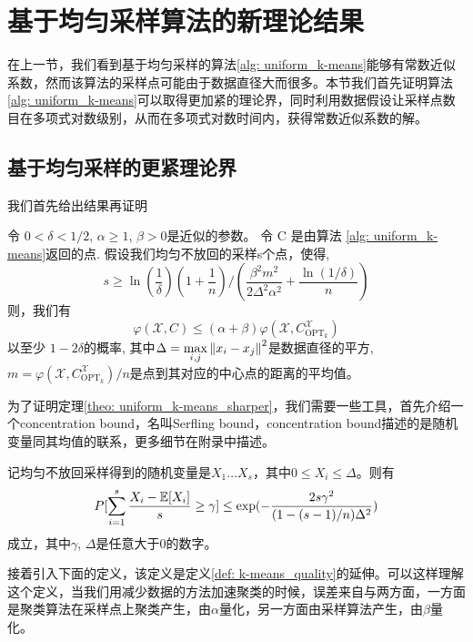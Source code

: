 \section{基于均匀采样算法的新理论结果}
在上一节，我们看到基于均匀采样的算法\ref{alg: uniform_k-means}能够有常数近似系数，然而该算法的采样点可能由于数据直径大而很多。本节我们首先证明算法\ref{alg: uniform_k-means}可以取得更加紧的理论界，同时利用数据假设让采样点数目在多项式对数级别，从而在多项式对数时间内，获得常数近似系数的解。
\subsection{基于均匀采样的更紧理论界}
我们首先给出结果再证明
\begin{theorem}[均匀不放回采样的解的质量2]
    \label{theo: uniform_k-means_sharper}
    令 $0 < \delta <1/2$, $\alpha \geq 1$, $\beta >0$是近似的参数。 令 C 是由算法 \ref{alg: uniform_k-means}返回的点. 假设我们均匀不放回的采样s个点，使得,
    \begin{equation}
    s \geq \ln(\frac{1}{\delta})(1+\frac{1}{n})/(\frac{\beta^2 m^2}{2\Delta^2 \alpha^2}+\frac{\ln(1/\delta)}{n})
    \end{equation}
    则，我们有
    \begin{equation}
    \varphi(\mathcal{X},C) \leq (\alpha + \beta)\varphi(\mathcal{X},C_{\text{OPT}_k}^{\mathcal{X}})
    \end{equation}
    以至少 $1-2\delta$的概率, 其中$\Delta = \max\limits_{i,j}\left\lVert x_i - x_j\right\rVert^2$是数据直径的平方, $m = \varphi(\mathcal{X},C_{\text{OPT}_k}^{\mathcal{X}})/n$是点到其对应的中心点的距离的平均值。
\end{theorem}
为了证明定理\ref{theo: uniform_k-means_sharper}，我们需要一些工具，首先介绍一个concentration bound，名叫Serfling bound，concentration bound描述的是随机变量同其均值的联系，更多细节在附录中描述。
\begin{lemma}
    记均匀不放回采样得到的随机变量是$X_1 \ldots X_s$，其中$0 \leq X_i \leq \Delta$。则有
    \begin{equation}
    P[\sum_{i=1}^s \frac{X_i - \mathbb{E}[X_i]}{s} \geq \gamma] \leq \exp(-\frac{2s\gamma^2}{(1-(s-1)/n)\Delta^2})
    \end{equation}
    成立，其中$\gamma$, $\Delta$是任意大于0的数字。
\end{lemma}
接着引入下面的定义，该定义是定义\ref{def: k-means_quality}的延伸。可以这样理解这个定义，当我们用减少数据的方法加速聚类的时候，误差来自与两方面，一方面是聚类算法在采样点上聚类产生，由$\alpha$量化，另一方面由采样算法产生，由$\beta$量化。
